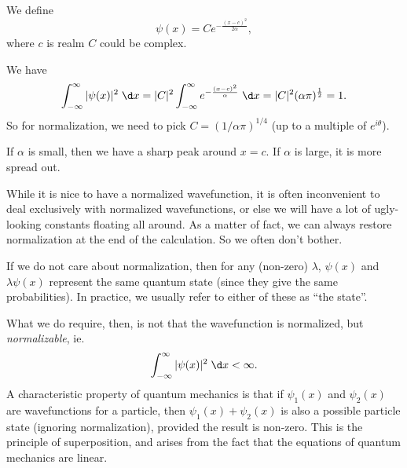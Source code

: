 \documentclass[a4paper]{article}
\begin{document}
\begin{eg}
  We define
  \[
    \psi(x) = C e^{-\frac{(x - c)^2}{2\alpha}},
  \]
  where $c$ is realm $C$ could be complex.
  \begin{center}
  \end{center}
  We have
  \[
    \int_{-\infty}^\infty |\psi(x)|^2 \;\d x = |C|^2 \int_{-\infty}^{\infty}e^{-\frac{(x - c)^2}{\alpha}} \;\d x = |C|^2 (\alpha \pi)^{\frac{1}{2}} = 1.
  \]
  So for normalization, we need to pick $C = (1/\alpha \pi)^{1/4}$ (up to a multiple of $e^{i\theta}$).

  If $\alpha$ is small, then we have a sharp peak around $x = c$. If $\alpha$ is large, it is more spread out.
\end{eg}
While it is nice to have a normalized wavefunction, it is often inconvenient to deal exclusively with normalized wavefunctions, or else we will have a lot of ugly-looking constants floating all around. As a matter of fact, we can always restore normalization at the end of the calculation. So we often don't bother.

If we do not care about normalization, then for any (non-zero) $\lambda$, $\psi(x)$ and $\lambda \psi(x)$ represent the same quantum state (since they give the same probabilities). In practice, we usually refer to either of these as ``the state''.

What we do require, then, is not that the wavefunction is normalized, but \emph{normalizable}, ie.
\[
  \int_{-\infty}^\infty |\psi(x)|^2 \;\d x < \infty.
\]
A characteristic property of quantum mechanics is that if $\psi_1(x)$ and $\psi_2(x)$ are wavefunctions for a particle, then $\psi_1(x) + \psi_2 (x)$ is also a possible particle state (ignoring normalization), provided the result is non-zero. This is the principle of superposition, and arises from the fact that the equations of quantum mechanics are linear.
\end{document}

